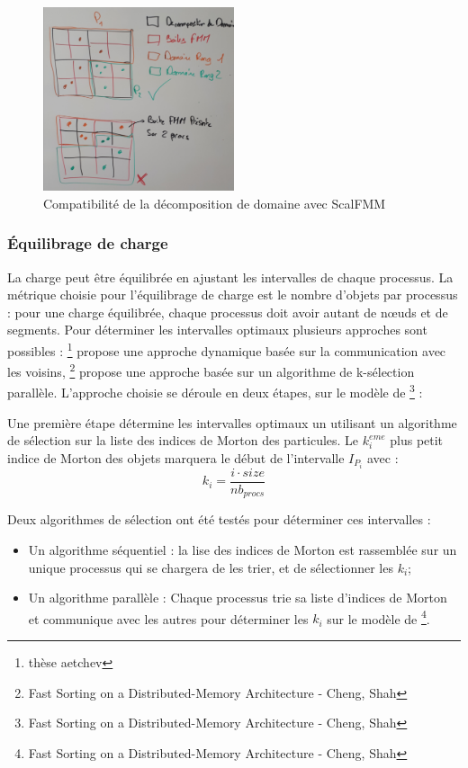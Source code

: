 \begin{figure}[]
\centering
\includegraphics[width=0.5\textwidth]{img/domaindecomposition_smaller_octree}
\caption{Compatibilité de la décomposition de domaine avec ScalFMM}
\label{fig:domaindecomposition_smaller_octree}
\end{figure}

\subsubsection{Équilibrage de charge}

La charge peut être équilibrée en ajustant les intervalles de chaque processus. La métrique choisie pour l'équilibrage de charge est le nombre d'objets par processus : pour une charge équilibrée, chaque processus doit avoir autant de nœuds et de segments. Pour déterminer les intervalles optimaux plusieurs approches sont possibles : \footnote{thèse aetchev} propose une approche dynamique basée sur la communication avec les voisins, \footnote{Fast Sorting on a Distributed-Memory Architecture - Cheng, Shah} propose une approche basée sur un algorithme de k-sélection parallèle. L'approche choisie se déroule en deux étapes, sur le modèle de \footnote{Fast Sorting on a Distributed-Memory Architecture - Cheng, Shah} :

Une première étape détermine les intervalles optimaux un utilisant un algorithme de sélection sur la liste des indices de Morton des particules. Le $k_i^{eme}$ plus petit indice de Morton des objets marquera le début de l'intervalle $I_{P_i}$ avec : 
\begin{equation}
    k_i=\frac{i \cdot size}{nb_{procs}}
\end{equation}

Deux algorithmes de sélection ont été testés pour déterminer ces intervalles : 
\begin{itemize}
	\item Un algorithme séquentiel : la lise des indices de Morton est rassemblée sur un unique processus qui se chargera de les trier, et de sélectionner les $k_i$;
	\item Un algorithme parallèle : Chaque processus trie sa liste d'indices de Morton et communique avec les autres pour déterminer les $k_i$ sur le modèle de  \footnote{Fast Sorting on a Distributed-Memory Architecture - Cheng, Shah}. 
\end{itemize}

